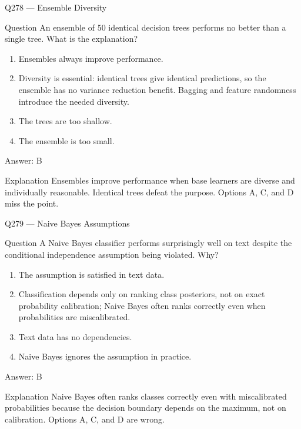 \documentclass[aspectratio=169,8pt]{beamer}
\begin{document}
\begin{frame}{Q278 --- Ensemble Diversity}
\begin{block}{Question}
An ensemble of 50 identical decision trees performs no better than a single tree. What is the explanation?
\end{block}
\begin{enumerate}
\item Ensembles always improve performance.
\item Diversity is essential: identical trees give identical predictions, so the ensemble has no variance reduction benefit. Bagging and feature randomness introduce the needed diversity.
\item The trees are too shallow.
\item The ensemble is too small.
\end{enumerate}
\begin{exampleblock}{Answer: B}\end{exampleblock}
\begin{block}{Explanation}
Ensembles improve performance when base learners are diverse and individually reasonable. Identical trees defeat the purpose. Options A, C, and D miss the point.
\end{block}
\end{frame}

\begin{frame}{Q279 --- Naive Bayes Assumptions}
\begin{block}{Question}
A Naive Bayes classifier performs surprisingly well on text despite the conditional independence assumption being violated. Why?
\begin{enumerate}
\item The assumption is satisfied in text data.
\item Classification depends only on ranking class posteriors, not on exact probability calibration; Naive Bayes often ranks correctly even when probabilities are miscalibrated.
\item Text data has no dependencies.
\item Naive Bayes ignores the assumption in practice.
\end{enumerate}\end{block}
\begin{exampleblock}{Answer: B}\end{exampleblock}
\begin{block}{Explanation}
Naive Bayes often ranks classes correctly even with miscalibrated probabilities because the decision boundary depends on the maximum, not on calibration. Options A, C, and D are wrong.
\end{block}
\end{frame}
\end{document}
